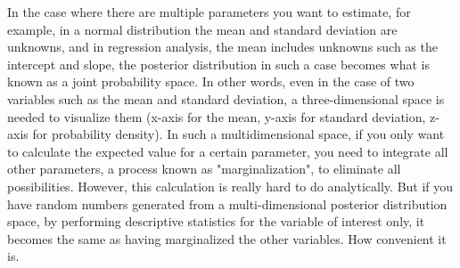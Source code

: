 \documentclass{ltjsbook}
\begin{document}
In the case where there are multiple parameters you want to estimate, for example, in a normal distribution the mean and standard deviation are unknowns, and in regression analysis, the mean includes unknowns such as the intercept and slope, the posterior distribution in such a case becomes what is known as a joint probability space. In other words, even in the case of two variables such as the mean and standard deviation, a three-dimensional space is needed to visualize them (x-axis for the mean, y-axis for standard deviation, z-axis for probability density). In such a multidimensional space, if you only want to calculate the expected value for a certain parameter, you need to integrate all other parameters, a process known as "marginalization", to eliminate all possibilities. However, this calculation is really hard to do analytically. But if you have random numbers generated from a multi-dimensional posterior distribution space, by performing descriptive statistics for the variable of interest only, it becomes the same as having marginalized the other variables. How convenient it is.
\end{document}
